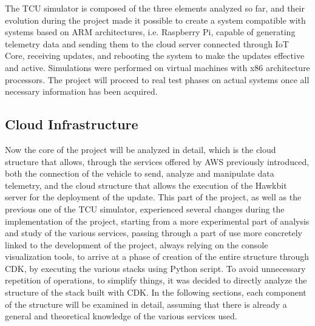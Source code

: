 The TCU simulator is composed of the three elements analyzed so far, and their evolution during the project made it possible to create a system compatible with systems based on ARM architectures, i.e. Raspberry Pi, capable of generating telemetry data and sending them to the cloud server connected through IoT Core, receiving updates, and rebooting the system to make the updates effective and active. Simulations were performed on virtual machines with x86 architecture processors. The project will proceed to real test phases on actual systems once all necessary information has been acquired.

\subsection{Cloud Infrastructure}
Now the core of the project will be analyzed in detail, which is the cloud structure that allows, through the services offered by AWS previously introduced, both the connection of the vehicle to send, analyze and manipulate data telemetry, and the cloud structure that allows the execution of the Hawkbit server for the deployment of the update. This part of the project, as well as the previous one of the TCU simulator, experienced several changes during the implementation of the project, starting from a more experimental part of analysis and study of the various services, passing through a part of use more concretely linked to the development of the project, always relying on the console visualization tools, to arrive at a phase of creation of the entire structure through CDK, by executing the various stacks using Python script. To avoid unnecessary repetition of operations, to simplify things, it was decided to directly analyze the structure of the stack built with CDK. In the following sections, each component of the structure will be examined in detail, assuming that there is already a general and theoretical knowledge of the various services used.


